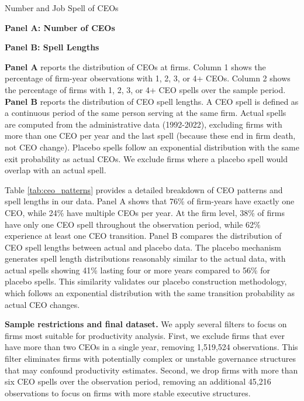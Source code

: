 \documentclass[11pt,a4paper]{article}
\begin{document}
\begin{table}[htbp]
\centering
\caption{Number and Job Spell of CEOs}
\label{tab:ceo_patterns}
\begin{minipage}{0.48\textwidth}
\centering
\textbf{Panel A: Number of CEOs}

\end{minipage}
\hfill
\begin{minipage}{0.48\textwidth}
\centering
\textbf{Panel B: Spell Lengths}

\end{minipage}
\begin{tablenotes}[flushleft]
\footnotesize
\item\textbf{Panel A} reports the distribution of CEOs at firms. Column 1 shows the percentage of firm-year observations with 1, 2, 3, or 4+ CEOs. Column 2 shows the percentage of firms with 1, 2, 3, or 4+ CEO spells over the sample period. \textbf{Panel B} reports the distribution of CEO spell lengths. A CEO spell is defined as a continuous period of the same person serving at the same firm.
Actual spells are computed from the administrative data (1992-2022), excluding firms with more than one CEO per year and the last spell (because these end in firm death, not CEO change). Placebo spells follow an exponential distribution with the same exit probability as actual CEOs. We exclude firms where a placebo spell would overlap with an actual spell.
\end{tablenotes}
\end{table}

Table \ref{tab:ceo_patterns} provides a detailed breakdown of CEO patterns and spell lengths in our data. Panel A shows that 76\% of firm-years have exactly one CEO, while 24\% have multiple CEOs per year. At the firm level, 38\% of firms have only one CEO spell throughout the observation period, while 62\% experience at least one CEO transition. Panel B compares the distribution of CEO spell lengths between actual and placebo data. The placebo mechanism generates spell length distributions reasonably similar to the actual data, with actual spells showing 41\% lasting four or more years compared to 56\% for placebo spells. This similarity validates our placebo construction methodology, which follows an exponential distribution with the same transition probability as actual CEO changes.

\textbf{Sample restrictions and final dataset.} We apply several filters to focus on firms most suitable for productivity analysis. First, we exclude firms that ever have more than two CEOs in a single year, removing 1,519,524 observations. This filter eliminates firms with potentially complex or unstable governance structures that may confound productivity estimates. Second, we drop firms with more than six CEO spells over the observation period, removing an additional 45,216 observations to focus on firms with more stable executive structures.
\end{document}
